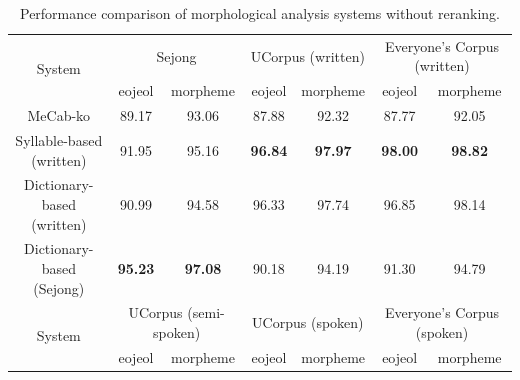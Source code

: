 \documentclass[AMS,STIX2COL]{WileyNJD-v2}
\begin{document}
    \begin{table}[ht]
        \caption{Performance comparison of morphological analysis systems without reranking.}
        \label{tab:performance-without-reranking}
        \begin{tabular*}{500pt}{@{\extracolsep\fill}c|cccccc@{\extracolsep\fill}}
            \toprule
            \multirow{2}{*}{System}                & \multicolumn{2}{c}{Sejong}                                & \multicolumn{2}{c}{UCorpus (written)}                     & \multicolumn{2}{c}{Everyone's Corpus (written)}           \\
            \cmidrule{2-3} \cmidrule{4-5} \cmidrule{6-7}
            ~                                      & \multicolumn{1}{c}{eojeol} & \multicolumn{1}{c}{morpheme} & \multicolumn{1}{c}{eojeol} & \multicolumn{1}{c}{morpheme} & \multicolumn{1}{c}{eojeol} & \multicolumn{1}{c}{morpheme} \\
            \midrule
            \hspace{2mm}MeCab-ko                   & 89.17                      & 93.06                        & 87.88                      & 92.32                        & 87.77                      & 92.05                        \\
            \hspace{2mm}Syllable-based (written)   & 91.95                      & 95.16                        & \textbf{96.84}             & \textbf{97.97}               & \textbf{98.00}             & \textbf{98.82}               \\
            \hspace{2mm}Dictionary-based (written) & 90.99                      & 94.58                        & 96.33                      & 97.74                        & 96.85                      & 98.14                        \\
            \hspace{2mm}Dictionary-based (Sejong)  & \textbf{95.23}             & \textbf{97.08}               & 90.18                      & 94.19                        & 91.30                      & 94.79                        \\
            \toprule
            \multirow{2}{*}{System}                & \multicolumn{2}{c}{UCorpus (semi-spoken)}                 & \multicolumn{2}{c}{UCorpus (spoken)}                      & \multicolumn{2}{c}{Everyone's Corpus (spoken)}            \\
            \cmidrule{2-3} \cmidrule{4-5} \cmidrule{6-7}
            ~                                      & \multicolumn{1}{c}{eojeol} & \multicolumn{1}{c}{morpheme} & \multicolumn{1}{c}{eojeol} & \multicolumn{1}{c}{morpheme} & \multicolumn{1}{c}{eojeol} & \multicolumn{1}{c}{morpheme} \\

\end{tabular*}
\end{table}
\end{document}
